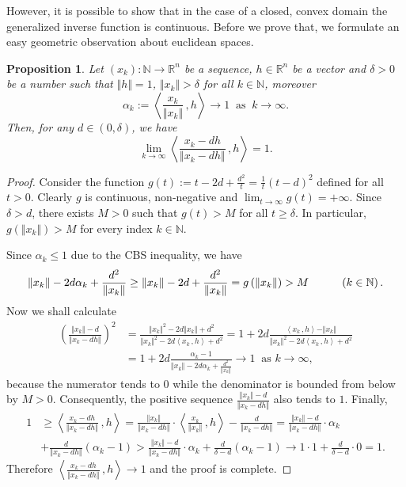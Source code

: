 \documentclass[12pt]{amsart}
\newtheorem{prop}{Proposition}%
\theoremstyle{remark}
\theoremstyle{definition}
\newcommand{\NN}{\mathbb{N}}
\newcommand{\Rn}{\mathbb{R}^n}
\newcommand{\nma}{\Vert}
\newcommand{\map}{\longrightarrow}
\newcommand{\bsz}[2]{\left \langle #1 \,, #2 \right \rangle}
\begin{document}
However, it is possible to show that in the 
case of a closed, convex domain the 
generalized inverse function is continuous. 
Before we prove that, we formulate an easy 
geometric observation about euclidean spaces.  

\begin{prop}\label{prop-AngleLimit}
Let $ (x_k) : \NN \map \Rn $ be a sequence, 
$ h \in \Rn $ be a vector and $ \delta > 0 $ be a number 
such that $ \nma h \nma = 1 $, 
$ \nma x_k \nma > \delta $ for all $ k \in \NN $, moreover 
\[
\alpha_k := 
\bsz	{\frac{x_k}{\nma x_k \nma}}{h} \to 1 
\ \mbox{ as } \ k \to \infty. 
\]
Then, for any $ d \in \left( 0, \delta \right) $, 
we have 
\[
\lim_{k \to \infty} 
\bsz{\frac{x_k-dh}{\nma x_k - dh \nma}}{h} 
= 1.
\] 
\end{prop}

\begin{proof}
Consider the function $ g(t) := t-2d+\frac{d^2}{t} = 
\frac{1}{t} \left( t-d \right)^2 $ 
defined for all $ t > 0 $. 
Clearly $ g $ is continuous, 
non-negative and 
$ \lim_{t \to \infty} g(t) = + \infty $. 
Since $ \delta > d $, there exists $ M > 0 $ such that 
$ g(t) > M $ for all $ t \geq \delta $. 
In particular, $ g \left( \nma x_k \nma \right) > M $ 
for every index $ k \in \NN $. 
 
Since $ \alpha_k \leq 1 $ due to the CBS inequality, 
we have 
\[ 
\nma x_k \nma - 2d \alpha_k + \frac{d^2}{\nma x_k \nma} \geq 
\nma x_k \nma - 2d + \frac{d^2}{\nma x_k \nma} = 
g \left( \nma x_k \nma \right) > M 
\hspace{10mm} \left( k \in \NN \right). 
\] 
Now we shall calculate 
\begin{align*}
\left( \frac{\nma x_k \nma - d}{\nma x_k - d h \nma} 
\right)^2 
& = 
\frac{\nma x_k \nma ^2 - 2d \nma x_k \nma + d^2}{
\nma x_k \nma ^2 - 2d \bsz{x_k}{h} + d^2} 
= 
1 + 2d \frac{\bsz{x_k}{h}-\nma x_k \nma}{
\nma x_k \nma ^2 - 2d \bsz{x_k}{h} + d^2} \\ 
& = 
1 + 2d \frac{\alpha_k - 1}{
\nma x_k \nma - 2d \alpha_k + \frac{d^2}{\nma x_k \nma}} 
\to 1 
\ \mbox{ as } k \to \infty, 
\end{align*}
because the numerator tends to $ 0 $ while the 
denominator is bounded from below by $ M > 0 $. 
Consequently, the positive sequence 
$ \frac{\nma x_k \nma - d}{\nma x_k - d h \nma} $ 
also tends to $ 1 $. Finally, 
\begin{align*}
1 & \geq \bsz{\frac{x_k-dh}{\nma x_k - dh \nma}}{h} = 
\frac{\nma x_k \nma}{\nma x_k - dh \nma} \cdot 
\bsz	{\frac{x_k}{\nma x_k \nma}}{h} - 
\frac{d}{\nma x_k - dh \nma} = 
\frac{\nma x_k \nma - d}{\nma x_k - d h \nma} \cdot \alpha_k 
\\ & + \frac{d}{\nma x_k - dh \nma} \left( \alpha_k - 1 \right) 
> 
\frac{\nma x_k \nma - d}{\nma x_k - d h \nma} \cdot \alpha_k 
+ \frac{d}{\delta-d} \left( \alpha_k - 1 \right) 
\to 1 \cdot 1 + \frac{d}{\delta-d} \cdot 0 = 1. 
\end{align*}
Therefore 
$ \bsz{\frac{x_k-dh}{\nma x_k - dh \nma}}{h} \to 1 $ 
and the proof is complete. 
\end{proof}
\end{document}
